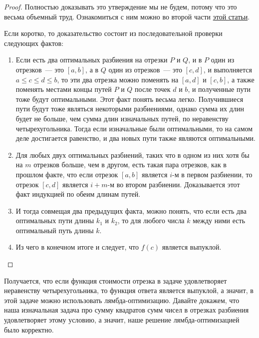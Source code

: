 \begin{proof}
    Полностью доказывать это утверждение мы не будем, потому что это весьма объемный труд. Ознакомиться с ним можно во второй части \href{https://cse.hkust.edu.hk/mjg_lib/bibs/DPSu/DPSu.Files/sdarticle_204.pdf}{этой статьи}.

    Если коротко, то доказательство состоит из последовательной проверки следующих фактов:

    \begin{enumerate}
        \item Если есть два оптимальных разбиения на отрезки $P$ и $Q$, и в $P$ один из отрезков~--- это $[a, b]$, а в $Q$ один из отрезков~--- это $[c, d]$, и выполняется $a \le c \le d \le b$, то эти два отрезка можно поменять на $[a, d]$ и $[c, b]$, а также поменять местами концы путей $P$ и $Q$ после точек $d$ и $b$, и полученные пути тоже будут оптимальными. Этот факт понять весьма легко. Получившиеся пути будут тоже являться некоторыми разбиениями, однако сумма их длин будет не больше, чем сумма длин изначальных путей, по неравенству четырехугольника. Тогда если изначальные были оптимальными, то на самом деле достигается равенство, и два новых пути также являются оптимальными.

        \item Для любых двух оптимальных разбиений, таких что в одном из них хотя бы на $m$ отрезков больше, чем в другом, есть такая пара отрезков, как в прошлом факте, что если отрезок $[a, b]$ является $i$-м в первом разбиении, то отрезок $[c, d]$ является $i+m$-м во втором разбиении. Доказывается этот факт индукцией по обеим длинам путей.

        \item И тогда совмещая два предыдущих факта, можно понять, что если есть два оптимальных пути длины $k_1$ и $k_2$, то для любого числа $k$ между ними есть оптимальный путь длины $k$.

        \item Из чего в конечном итоге и следует, что $f(c)$ является выпуклой.
    \end{enumerate}
\end{proof}

Получается, что если функция стоимости отрезка в задаче удовлетворяет неравенству четырехугольника, то функция ответа является выпуклой, а значит, в этой задаче можно использовать лямбда-оптимизацию. Давайте докажем, что наша изначальная задача про сумму квадратов сумм чисел в отрезках разбиения удовлетворяет этому условию, а значит, наше решение лямбда-оптимизацией было корректно.


